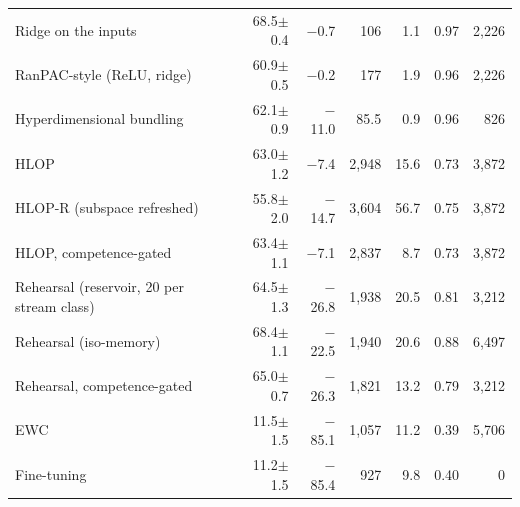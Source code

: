 \begin{tabular*}{\textwidth}{@{\extracolsep{\fill}}lrrrrrr@{}}
Ridge on the inputs & 68.5$\pm$0.4 & \ensuremath{-}0.7 & 106 & 1.1 & 0.97 & 2,226 \\
RanPAC-style (ReLU, ridge) & 60.9$\pm$0.5 & \ensuremath{-}0.2 & 177 & 1.9 & 0.96 & 2,226 \\
Hyperdimensional bundling & 62.1$\pm$0.9 & \ensuremath{-}11.0 & 85.5 & 0.9 & 0.96 & 826 \\
HLOP & 63.0$\pm$1.2 & \ensuremath{-}7.4 & 2,948 & 15.6 & 0.73 & 3,872 \\
HLOP-R (subspace refreshed) & 55.8$\pm$2.0 & \ensuremath{-}14.7 & 3,604 & 56.7 & 0.75 & 3,872 \\
HLOP, competence-gated & 63.4$\pm$1.1 & \ensuremath{-}7.1 & 2,837 & 8.7 & 0.73 & 3,872 \\
Rehearsal (reservoir, 20 per stream class) & 64.5$\pm$1.3 & \ensuremath{-}26.8 & 1,938 & 20.5 & 0.81 & 3,212 \\
Rehearsal (iso-memory) & 68.4$\pm$1.1 & \ensuremath{-}22.5 & 1,940 & 20.6 & 0.88 & 6,497 \\
Rehearsal, competence-gated & 65.0$\pm$0.7 & \ensuremath{-}26.3 & 1,821 & 13.2 & 0.79 & 3,212 \\
EWC & 11.5$\pm$1.5 & \ensuremath{-}85.1 & 1,057 & 11.2 & 0.39 & 5,706 \\
Fine-tuning & 11.2$\pm$1.5 & \ensuremath{-}85.4 & 927 & 9.8 & 0.40 & 0 \\
\bottomrule
\end{tabular*}
